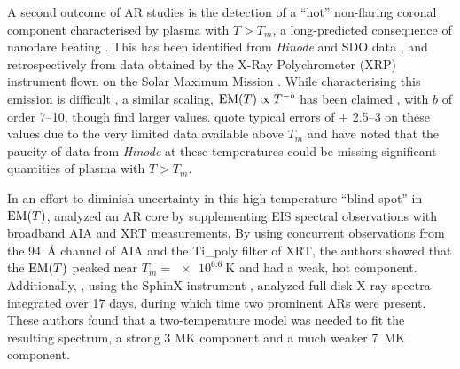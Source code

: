 A second outcome of AR studies is the detection of a ``hot'' non-flaring coronal component characterised by plasma with $T > T_m$, a long-predicted consequence of nanoflare heating \citep{cargill_implications_1994,cargill_diagnostics_1995}. This has been identified from \textit{Hinode} and SDO data \citep{reale_evidence_2009,schmelz_hinode_2009,testa_hinode/eis_2012}, and retrospectively from data obtained by the X-Ray Polychrometer (XRP) instrument flown on the Solar Maximum Mission \citep{del_zanna_elemental_2014}. While characterising this emission is difficult \citep[e.g.][]{testa_temperature_2011,winebarger_defining_2012}, a similar scaling, $\emd[T] \propto T^{-b}$ has been claimed \citep[e.g.][]{warren_systematic_2012}, with $b$ of order \numrange{7}{10}, though \citeauthor{del_zanna_elemental_2014} find larger values. \citeauthor{warren_systematic_2012} quote typical errors of $\pm$ \numrange{2.5}{3} on these values due to the very limited data available above $T_m$ and \citeauthor{winebarger_defining_2012} have noted that the paucity of data from \textit{Hinode} at these temperatures could be missing significant quantities of plasma with $T > T_m$.
    
In an effort to diminish uncertainty in this high temperature ``blind spot'' in $\emd[T]$, \citet{petralia_thermal_2014} analyzed an AR core by supplementing EIS spectral observations with broadband AIA and XRT measurements. By using concurrent observations from the  \SI{94}{\angstrom} channel of AIA and the Ti\_poly filter of XRT, the authors showed that the $\emd[T]$ peaked near $T_m = \SI{e6.6}{\kelvin}$ and had a weak, hot component. Additionally, \citet{miceli_x-ray_2012}, using the SphinX instrument \citep{sylwester_sphinx_2008,gburek_sphinx_2011}, analyzed full-disk X-ray spectra integrated over 17 days, during which time two prominent ARs were present. These authors found that a two-temperature model was needed to fit the resulting spectrum, a strong 3 MK component and a much weaker \SI{7}{\mega\kelvin} component.

